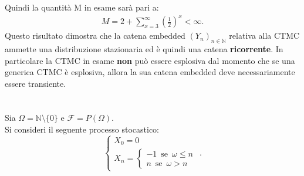\documentclass[11pt,largemargins]{homework}
\begin{document}
\begin{alphaparts}
  Quindi la quantità M in esame sarà pari a:
  \begin{gather*}
    M = 2 +  \sum \limits_{x=3}^{\infty} \left(\frac{1}{2}\right)^x < \infty.
  \end{gather*}
  Questo risultato dimostra che la catena embedded \((Y_n)_{n \in \mathbb{N}}\) relativa alla CTMC ammette una distribuzione stazionaria ed è quindi una catena \textbf{ricorrente}. In particolare la CTMC in esame \textbf{non} può essere esplosiva dal momento che se una generica CTMC è esplosiva, allora la sua catena embedded deve necessariamente essere transiente.










  \end{alphaparts}
  
  
  \newpage
  \section{}%
  
  Sia $\Omega=\mathbb{N}\setminus \{0\}$ e $\mathcal{F}=P\left(\Omega\right)$.\\
  Si consideri il seguente processo stocastico:
  \begin{equation*}
  \begin{cases} X_{0}=0\\X_{n}=\begin{cases}-1 \,\,\, \text{se} \,\,\, \omega\leq n\\n \,\,\, \text{se} \,\,\, \omega> n\end{cases} \end{cases}.
  \end{equation*}
  
\end{document}
